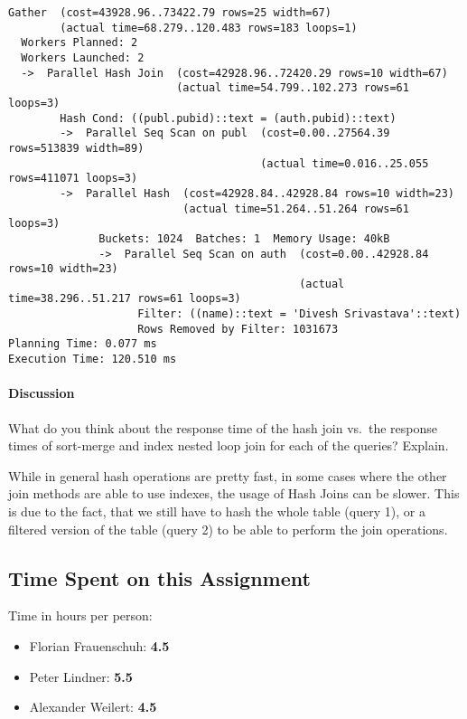 \documentclass[11pt]{scrartcl}
\begin{document}
  {\small
\parskip0pt\begin{verbatim}
Gather  (cost=43928.96..73422.79 rows=25 width=67)
        (actual time=68.279..120.483 rows=183 loops=1)
  Workers Planned: 2
  Workers Launched: 2
  ->  Parallel Hash Join  (cost=42928.96..72420.29 rows=10 width=67)
                          (actual time=54.799..102.273 rows=61 loops=3)
        Hash Cond: ((publ.pubid)::text = (auth.pubid)::text)
        ->  Parallel Seq Scan on publ  (cost=0.00..27564.39 rows=513839 width=89)
                                       (actual time=0.016..25.055 rows=411071 loops=3)
        ->  Parallel Hash  (cost=42928.84..42928.84 rows=10 width=23)
                           (actual time=51.264..51.264 rows=61 loops=3)
              Buckets: 1024  Batches: 1  Memory Usage: 40kB
              ->  Parallel Seq Scan on auth  (cost=0.00..42928.84 rows=10 width=23)
                                             (actual time=38.296..51.217 rows=61 loops=3)
                    Filter: ((name)::text = 'Divesh Srivastava'::text)
                    Rows Removed by Filter: 1031673
Planning Time: 0.077 ms
Execution Time: 120.510 ms
\end{verbatim}}

\paragraph{Discussion}

What do you think about the response time of the hash join vs.\ the response times of sort-merge and index nested loop join for each of the queries?
Explain.

While in general hash operations are pretty fast, in some cases where the other join methods are able to use indexes,
the usage of Hash Joins can be slower.
This is due to the fact, that we still have to hash the whole table (query 1), or a filtered version of the table
(query 2) to be able to perform the join operations.

\subsection*{Time Spent on this Assignment}

Time in hours per person:

\begin{itemize}
  \item Florian Frauenschuh: \textbf{4.5}
  \item Peter Lindner: \textbf{5.5}
  \item Alexander Weilert: \textbf{4.5}
\end{itemize}
\end{document}

